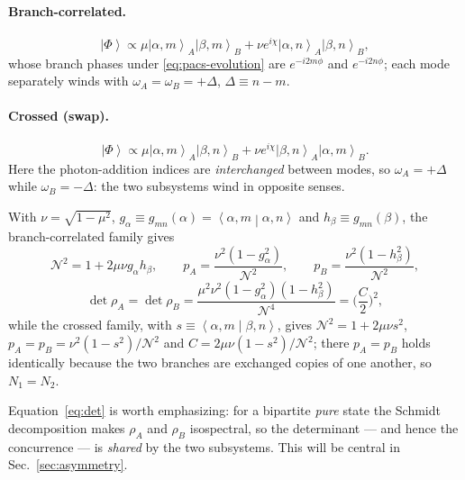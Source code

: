 \documentclass[11pt]{article}
\newcommand{\ket}[1]{\left|#1\right\rangle}
\newcommand{\braket}[2]{\left\langle#1\middle|#2\right\rangle}
\begin{document}
\paragraph{Branch-correlated.}
\begin{equation}
\ket{\Phi}\propto\mu\ket{\alpha,m}_A\ket{\beta,m}_B
+\nu e^{i\chi}\ket{\alpha,n}_A\ket{\beta,n}_B ,
\label{eq:correlated}
\end{equation}
whose branch phases under \eqref{eq:pacs-evolution} are $e^{-i2m\phi}$ and
$e^{-i2n\phi}$; each mode separately winds with $\omega_A=\omega_B=+\Delta$,
$\Delta\equiv n-m$.

\paragraph{Crossed (swap).}
\begin{equation}
\ket{\Phi}\propto\mu\ket{\alpha,m}_A\ket{\beta,n}_B
+\nu e^{i\chi}\ket{\beta,n}_A\ket{\alpha,m}_B .
\label{eq:crossed}
\end{equation}
Here the photon-addition indices are \emph{interchanged} between modes, so
$\omega_A=+\Delta$ while $\omega_B=-\Delta$: the two subsystems wind in
opposite senses.

With $\nu=\sqrt{1-\mu^2}$, $g_\alpha\equiv g_{mn}(\alpha)=\braket{\alpha,m}{\alpha,n}$
and $h_\beta\equiv g_{mn}(\beta)$, the branch-correlated family gives
\begin{equation}
\mathcal N^2=1+2\mu\nu g_\alpha h_\beta,\qquad
p_A=\frac{\nu^2(1-g_\alpha^2)}{\mathcal N^2},\qquad
p_B=\frac{\nu^2(1-h_\beta^2)}{\mathcal N^2},
\label{eq:pApB}
\end{equation}
\begin{equation}
\det\rho_A=\det\rho_B=\frac{\mu^2\nu^2(1-g_\alpha^2)(1-h_\beta^2)}{\mathcal N^4}
=\Big(\frac{C}{2}\Big)^2 ,
\label{eq:det}
\end{equation}
while the crossed family, with $s\equiv\braket{\alpha,m}{\beta,n}$, gives
$\mathcal N^2=1+2\mu\nu s^2$, $p_A=p_B=\nu^2(1-s^2)/\mathcal N^2$ and
$C=2\mu\nu(1-s^2)/\mathcal N^2$; there $p_A=p_B$ holds identically because the
two branches are exchanged copies of one another, so $N_1=N_2$.

Equation~\eqref{eq:det} is worth emphasizing: for a bipartite \emph{pure}
state the Schmidt decomposition makes $\rho_A$ and $\rho_B$ isospectral, so the
determinant --- and hence the concurrence --- is \emph{shared} by the two
subsystems. This will be central in Sec.~\ref{sec:asymmetry}.

\end{document}
